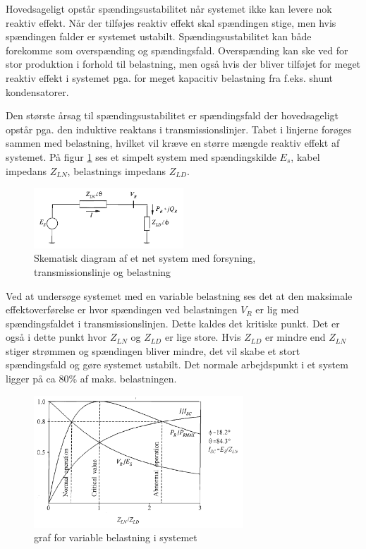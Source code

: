 Hovedsageligt opstår spændingsustabilitet når systemet ikke kan levere nok reaktiv effekt. Når der tilføjes reaktiv effekt skal spændingen stige, men hvis spændingen falder er systemet ustabilt. Spændingsustabilitet kan både forekomme som overspænding og spændingsfald. Overspænding kan ske ved for stor produktion i forhold til belastning, men også hvis der bliver tilføjet for meget reaktiv effekt i systemet pga. for meget kapacitiv belastning fra f.eks. shunt kondensatorer. 

Den største årsag til spændingsustabilitet er spændingsfald der hovedsageligt opstår pga. den induktive reaktans i transmissionslinjer. Tabet i linjerne forøges sammen med belastning, hvilket vil kræve en større mængde reaktiv effekt af systemet. På figur \ref{fig:Voltage1} ses et simpelt system med spændingskilde $E_{s}$, kabel impedans $Z_{LN}$, belastnings impedans $Z_{LD}$. 


\begin{figure}[H] %
	\centering
	\includegraphics[width=0.5\textwidth]{figurer/Voltage_system}
	\caption{Skematisk diagram af et net system med forsyning, transmissionslinje og belastning}
	\label{fig:Voltage1}
\end{figure}

Ved at undersøge systemet med en variable belastning ses det at den maksimale effektoverførelse er hvor spændingen ved belastningen $V_{R}$ er lig med spændingsfaldet i transmissionslinjen. Dette kaldes det kritiske punkt. Det er også i dette punkt hvor $Z_{LN}$ og $Z_{LD}$ er lige store. Hvis $Z_{LD}$ er mindre end $Z_{LN}$ stiger strømmen og spændingen bliver mindre, det vil skabe et stort spændingsfald og gøre systemet ustabilt. Det normale arbejdspunkt i et system ligger på ca 80\% af maks. belastningen.

\begin{figure}[H] %
	\centering
	\includegraphics[width=0.7\textwidth]{figurer/Voltage_curve}
	\caption{graf for variable belastning i systemet}
	\label{fig:Voltage2}
\end{figure}



